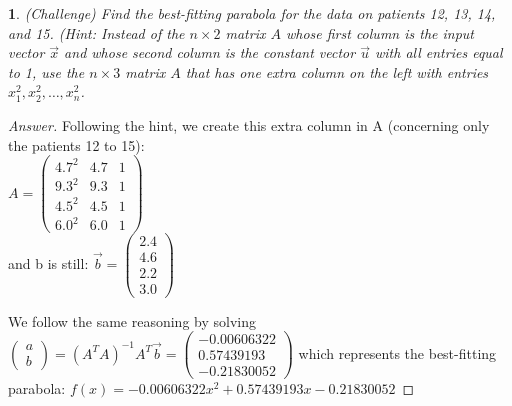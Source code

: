 \documentclass [11pt, letterpaper] {amsart}
\theoremstyle{plain}
\newtheorem{exer}{}
\theoremstyle{definition}
\begin{document}
\vspace{0.05in}

    
\vspace{0.05in}
\begin{exer} 

(Challenge) Find the best-fitting \textit{parabola} for the data on patients 12, 13, 14, and 15. \newline (\textit{Hint:} Instead of the $n\times 2$ matrix $A$ whose first column is the input vector $\vec{x}$ and whose second column is the constant vector $\vec{u}$ with all entries equal to 1, use the $n\times 3$ matrix $A$ that has one extra column on the left with entries $x_1^2, x_2^2,\ldots, x_n^2$. 
   
\end{exer}

\begin{proof}[Answer]
Following the hint, we create this extra column in A (concerning only the patients 12 to 15): \\
$A = \left(\begin{matrix}
                    4.7^2 &4.7& 1\\
                    9.3^2 &9.3& 1\\
                    4.5^2 &4.5& 1\\
                    6.0^2 &6.0 &1
                  \end{matrix}\right)$
                  \\and b is still: $\vec{b}=\left(\begin{matrix}
                    2.4\\
                    4.6\\
                    2.2\\
                    3.0
                  \end{matrix}\right)$
            
We follow the same reasoning by solving $\left(\begin{matrix}
                    a\\
                    b
                  \end{matrix}\right) = (A^TA)^{-1}A^T\vec{b} = \left(\begin{matrix}
                    -0.00606322\\
                    0.57439193\\
                    -0.21830052
                  \end{matrix}\right)$ which represents the best-fitting parabola: $f(x) = -0.00606322x^2 + 0.57439193x -0.21830052  $
               
\end{proof}
\end{document}
